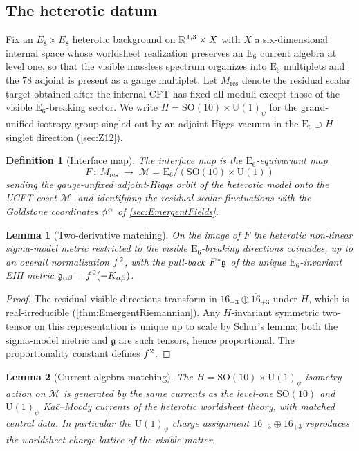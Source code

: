 \documentclass[pdflatex,sn-mathphys-num]{sn-jnl}
\theoremstyle{thmstyleone}
\newtheorem{lemma}[lemma]{Lemma}
\theoremstyle{thmstyletwo}%
\theoremstyle{thmstylethree}%
\newtheorem{definition}{Definition}%
\newcommand{\SO}[1]{\mathrm{SO(#1)}}
\newcommand{\U}[1]{\mathrm{U(#1)}}
\newcommand{\E}[1]{\mathrm{E_{#1}}}
\newcommand{\M}{\mathcal{M}}
\newcommand{\SOTen}{\SO{10}}
\newcommand{\UOne}{\U{1}}
\newcommand{\ESix}{\E{6}}
\newcommand{\SOTenXUOne}{\SOTen \times \UOne}
\newcommand{\MCosetInline}{\ESix/(\SOTenXUOne)}
\newcommand{\sm}{\hspace{.065em}}
\newcommand{\smexp}[1]{^{\sm #1}}
\begin{document}
\subsection{The heterotic datum}

Fix an $E_{8}\times E_{8}$ heterotic background on
$\mathbb R\smexp{1,3}\times X$ with $X$ a six-dimensional internal space whose
worldsheet realization preserves an $\ESix$ current algebra at level one, so
that the visible massless spectrum organizes into $\ESix$ multiplets and the
$78$ adjoint is present as a gauge multiplet.  Let $M_{\mathrm{res}}$ denote the
residual scalar target obtained after the internal CFT has fixed all moduli
except those of the visible $\ESix$-breaking sector.  We write $H=\SOTenXUOne_\psi$
for the grand-unified isotropy group singled out by an adjoint Higgs vacuum in
the $\ESix\supset H$ singlet direction (\autoref{sec:Z12}).

\begin{definition}[Interface map]
\label{def:Interface}
The \emph{interface map} is the $\ESix$-equivariant map
\[
  F\ :\ M_{\mathrm{res}}\;\longrightarrow\;\M=\MCosetInline
\]
sending the gauge-unfixed adjoint-Higgs orbit of the heterotic model onto the
UCFT coset $\M$, and identifying the residual scalar fluctuations with the
Goldstone coordinates $\phi\smexp{\alpha}$ of \autoref{sec:EmergentFields}.
\end{definition}

\begin{lemma}[Two-derivative matching]
\label{lem:TwoDerivative}
On the image of $F$ the heterotic non-linear sigma-model metric restricted to the
visible $\ESix$-breaking directions coincides, up to an overall normalization
$f\smexp{2}$, with the pull-back $F\smexp{\ast}\mathfrak g$ of the unique
$\ESix$-invariant EIII metric $\mathfrak g_{\alpha\beta}=f\smexp{2}(-K_{\alpha\beta})$.
\end{lemma}

\begin{proof}
The residual visible directions transform in $16_{-3}\oplus\overline{16}_{+3}$
under $H$, which is real-irreducible (\autoref{thm:EmergentRiemannian}).  Any
$H$-invariant symmetric two-tensor on this representation is unique up to scale
by Schur's lemma; both the sigma-model metric and $\mathfrak g$ are such
tensors, hence proportional.  The proportionality constant defines
$f\smexp{2}$.
\end{proof}

\begin{lemma}[Current-algebra matching]
\label{lem:Current}
The $H=\SOTenXUOne_\psi$ isometry action on $\M$ is generated by the same
currents as the level-one $\SOTen$ and $\UOne_\psi$ Ka\v{c}--Moody currents of
the heterotic worldsheet theory, with matched central data.  In particular the
$\UOne_\psi$ charge assignment $16_{-3}\oplus\overline{16}_{+3}$ reproduces the
worldsheet charge lattice of the visible matter.
\end{lemma}
\end{document}
